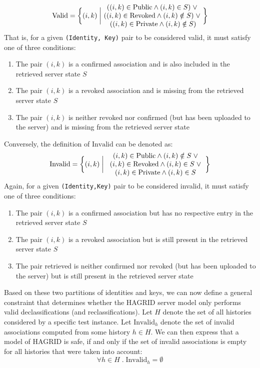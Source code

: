 \begin{equation}
    \text{Valid} = \biggl \{ (i,k) \;\bigg|\; \pctext{1.97in}{
        \( ((i,k) \in \text{Public}  \wedge (i,k) \in S)\; \vee \; \)
        \( ((i,k) \in \text{Revoked} \wedge (i,k) \notin S)\; \vee \; \)
        \( ((i,k) \in \text{Private} \wedge (i,k) \notin S) \) }  
    \biggr \}
\end{equation}
That is, for a given \texttt{(Identity, Key)} pair to be considered valid, it must satisfy one of three conditions: 
\begin{enumerate}
    \item The pair \((i,k)\) is a confirmed association and is also included in the retrieved server state \(S\)
    \item The pair \((i,k)\) is a revoked association and is missing from the retrieved server state \(S\)
    \item The pair \((i,k)\) is neither revoked nor confirmed (but has been uploaded to the server) and is missing from the retrieved server state
\end{enumerate}
Conversely, the definition of \(\text{Invalid}\) can be denoted as: 
\begin{equation}
    \text{Invalid} = \biggl \{
        (i,k) \;\bigg|\; \pctext{1.97in}{
            \((i,k) \in \text{Public}  \wedge (i,k) \notin S \; \vee \)
            \((i,k) \in \text{Revoked} \wedge (i,k) \in S \; \vee \)
            \((i,k) \in \text{Private} \wedge (i,k) \in S\)
        }
    \biggr \}
\end{equation}
Again, for a given \texttt{(Identity,Key)} pair to be considered invalid, it must satisfy one of three conditions:

\begin{enumerate}
    \item The pair \((i,k)\) is a confirmed association but has no respective entry in the retrieved server state \(S\)
    \item The pair \((i,k)\) is a revoked association but is still present in the retrieved server state \(S\)
    \item The pair retrieved is neither confirmed nor revoked (but has been uploaded to the server) but is still present in the retrieved server state
\end{enumerate}

Based on these two partitions of identities and keys, we can now define a general constraint that determines whether the HAGRID server model only performs valid declassifications (and reclassifications). 
Let \(H\) denote the set of all histories considered by a specific test instance. Let \(\text{Invalid}_h\) denote the set of invalid associations computed from some history \(h \in H\). We can then express that a model of HAGRID is safe, if and only if the set of invalid associations is empty for all histories that were taken into account:
\[
    \forall h \in H \; .\; \text{Invalid}_h = \emptyset
\]


